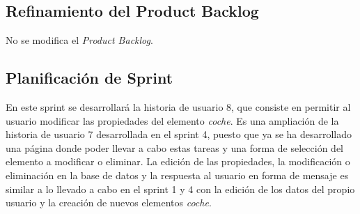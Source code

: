 	\subsection{Refinamiento del Product Backlog}
	No se modifica el \textit{Product Backlog}.
	
	\subsection{Planificación de Sprint}
	En este sprint se desarrollará la historia de usuario 8, que consiste en permitir al usuario modificar las propiedades del elemento \textit{coche}. Es una ampliación de la historia de usuario 7 desarrollada en el sprint 4, puesto que ya se ha desarrollado una página donde poder llevar a cabo estas tareas y una forma de selección del elemento a modificar o eliminar. La edición de las propiedades, la modificación o eliminación en la base de datos y la respuesta al usuario en forma de mensaje es similar a lo llevado a cabo en el sprint 1 y 4 con la edición de los datos del propio usuario y la creación de nuevos elementos \textit{coche}.
	
